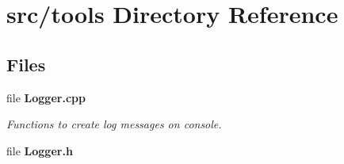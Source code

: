\section{src/tools Directory Reference}
\label{dir_1563a38af0d3a5e4a6330d6d45e9792a}
\subsection*{Files}
\begin{DoxyCompactItemize}
\item 
file \textbf{ Logger.\+cpp}
\begin{DoxyCompactList}\small\item\em Functions to create log messages on console. \end{DoxyCompactList}\item 
file \textbf{ Logger.\+h}
\end{DoxyCompactItemize}
